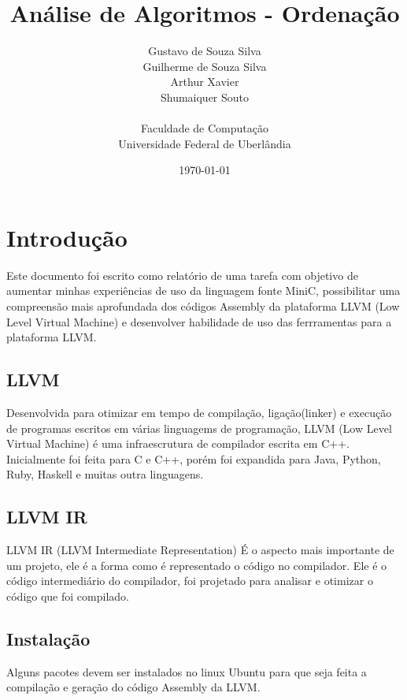 \documentclass[12pt,a4paper,twoside]{report}
\title{Análise de Algoritmos - Ordenação}
\date{}
\author{Gustavo de Souza Silva \\ Guilherme de Souza Silva \\ Arthur Xavier \\ Shumaiquer Souto \\
\vspace{1cm} \\
Faculdade de Computação \\
Universidade Federal de Uberlândia
}
\date{\today}
\begin{document}
  \maketitle
\lstlistoflistings

\tableofcontents    


\fancyhead[RE,LO]{\thesection}

\setlength{\parskip}{0.15in} %

\chapter{Introdução}
Este documento foi escrito como relatório de uma tarefa com objetivo de aumentar minhas experiências de uso da linguagem fonte MiniC, possibilitar uma compreensão mais aprofundada dos códigos Assembly da plataforma LLVM (Low Level Virtual Machine) e desenvolver habilidade de uso das ferrramentas para a plataforma LLVM.

\section{LLVM}
Desenvolvida para otimizar em tempo de compilação, ligação(linker) e execução de programas escritos em várias linguagems de programação, LLVM (Low Level Virtual Machine) é uma infraescrutura de compilador escrita em C++. Inicialmente foi feita para C e C++, porém foi expandida para Java, Python, Ruby, Haskell e muitas outra linguagens.

\section{LLVM IR}
LLVM IR (LLVM Intermediate Representation) É o aspecto mais importante de um projeto, ele é a forma como é representado o código no compilador. Ele é o código intermediário do compilador, foi projetado para analisar e otimizar o código que foi compilado.

\section{Instalação}
Alguns pacotes devem ser instalados no linux Ubuntu para que seja feita a compilação e geração do código Assembly da LLVM.
\end{document}
